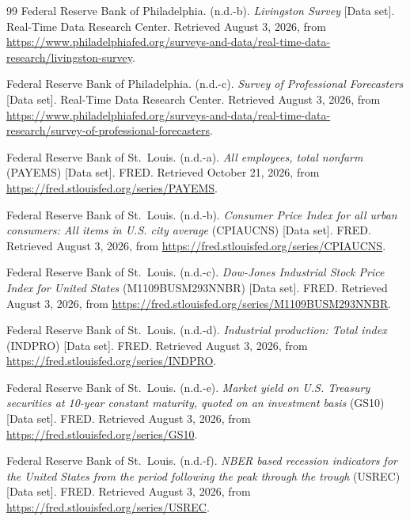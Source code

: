 \begin{thebibliography}{99}
Federal Reserve Bank of Philadelphia. (n.d.-b). \textit{Livingston Survey} [Data set]. Real-Time Data Research Center. Retrieved August 3, 2026, from
\url{https://www.philadelphiafed.org/surveys-and-data/real-time-data-research/livingston-survey}.

Federal Reserve Bank of Philadelphia. (n.d.-c). \textit{Survey of Professional Forecasters} [Data set]. Real-Time Data Research Center. Retrieved August 3, 2026, from
\url{https://www.philadelphiafed.org/surveys-and-data/real-time-data-research/survey-of-professional-forecasters}.

Federal Reserve Bank of St.\ Louis. (n.d.-a). \textit{All employees, total nonfarm} (PAYEMS) [Data set]. FRED. Retrieved October 21, 2026, from
\url{https://fred.stlouisfed.org/series/PAYEMS}.

Federal Reserve Bank of St.\ Louis. (n.d.-b). \textit{Consumer Price Index for all urban consumers: All items in U.S. city average} (CPIAUCNS) [Data set]. FRED. Retrieved August 3, 2026, from
\url{https://fred.stlouisfed.org/series/CPIAUCNS}.

Federal Reserve Bank of St.\ Louis. (n.d.-c). \textit{Dow-Jones Industrial Stock Price Index for United States} (M1109BUSM293NNBR) [Data set]. FRED. Retrieved August 3, 2026, from
\url{https://fred.stlouisfed.org/series/M1109BUSM293NNBR}.

Federal Reserve Bank of St.\ Louis. (n.d.-d). \textit{Industrial production: Total index} (INDPRO) [Data set]. FRED. Retrieved August 3, 2026, from
\url{https://fred.stlouisfed.org/series/INDPRO}.

Federal Reserve Bank of St.\ Louis. (n.d.-e). \textit{Market yield on U.S. Treasury securities at 10-year constant maturity, quoted on an investment basis} (GS10) [Data set]. FRED. Retrieved August 3, 2026, from
\url{https://fred.stlouisfed.org/series/GS10}.

Federal Reserve Bank of St.\ Louis. (n.d.-f). \textit{NBER based recession indicators for the United States from the period following the peak through the trough} (USREC) [Data set]. FRED. Retrieved August 3, 2026, from
\url{https://fred.stlouisfed.org/series/USREC}.


\end{thebibliography}
